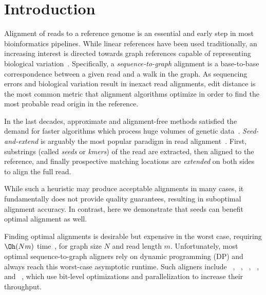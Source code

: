 \section{Introduction}

Alignment of reads to a reference genome is an essential and early step in most
bioinformatics pipelines. While linear references have been used traditionally,
an increasing interest is directed towards graph references capable of
representing biological variation~\citep{garrison_variation_2018}.
%
Specifically, a \emph{sequence-to-graph} alignment is a base-to-base
correspondence between a given read and a walk in the graph. As sequencing
errors and biological variation result in inexact read alignments, edit distance
is the most common metric that alignment algorithms optimize in order to find
the most probable read origin in the reference.


%
In the last decades, approximate and alignment-free methods satisfied the demand
for faster algorithms which process huge volumes of genetic
data~\citep{kucherov2019evolution}. 
%
\emph{Seed-and-extend} is arguably the most popular paradigm in read
alignment~\citep{altschul_basic_1990,langmead_fast_2012,li_fast_2009}. First,
substrings (called \emph{seeds} or \emph{kmers}) of the read are extracted, then
aligned to the reference, and finally prospective matching locations are
\emph{extended} on both sides to align the full read.

While such a heuristic may produce acceptable alignments in many cases, it
fundamentally does not provide quality guarantees, resulting in suboptimal
alignment accuracy.
%
In contrast, here we demonstrate that seeds can benefit optimal alignment as
well.

%
Finding optimal alignments is desirable but expensive in the worst case,
requiring $\Oh(Nm)$ time~\citep{equi2019complexity}, for graph size $N$ and read
length $m$.
%
Unfortunately, most optimal sequence-to-graph aligners rely on dynamic
programming (DP) and always reach this worst-case asymptotic runtime. Such
aligners include \vargas~\citep{darby2020vargas},
\pasgal~\citep{jain_accelerating_2019},
\graphaligner~\citep{rautiainen_bitparallel_2019},
\hga~\citep{feng2021accelerating}, and \vg~\citep{garrison_variation_2018},
which use bit-level optimizations and parallelization to increase their
throughput.

